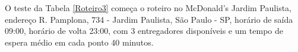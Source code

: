 \begin{center}
	\label{fig:Extra-Entregador1}
\end{center}

\begin{center}
	\label{fig:Extra-Entregador2}
\end{center}

\pagebreak
O teste da Tabela \ref{Roteiro3} começa o roteiro no McDonald's Jardim Paulista, endereço R. Pamplona, 734 - Jardim Paulista, São Paulo - SP, horário de saída 09:00, horário de volta 23:00, com 3 entregadores disponíveis e um tempo de espera médio em cada ponto 40 minutos.

